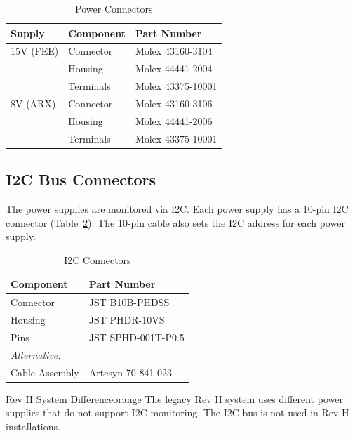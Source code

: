 \begin{table}[htbp]
    \centering
    \caption{Power Connectors}
    \label{tab:power-connectors}
    \begin{tabular}{lll}
        \toprule
        \textbf{Supply} & \textbf{Component} & \textbf{Part Number} \\
        \midrule
        15V (FEE) & Connector & Molex 43160-3104 \\
                  & Housing & Molex 44441-2004 \\
                  & Terminals & Molex 43375-10001 \\
        \midrule
        8V (ARX)  & Connector & Molex 43160-3106 \\
                  & Housing & Molex 44441-2006 \\
                  & Terminals & Molex 43375-10001 \\
        \bottomrule
    \end{tabular}
\end{table}

\subsection{I2C Bus Connectors}

The power supplies are monitored via I2C. Each power supply has a 10-pin I2C connector (Table~\ref{tab:i2c-connectors}).  The 10-pin cable also sets the I2C address for each power supply.

\begin{table}[htbp]
    \centering
    \caption{I2C Connectors}
    \label{tab:i2c-connectors}
    \begin{tabular}{ll}
        \toprule
        \textbf{Component} & \textbf{Part Number} \\
        \midrule
        Connector & JST B10B-PHDSS \\
        Housing & JST PHDR-10VS \\
        Pins & JST SPHD-001T-P0.5 \\
        \midrule
        \multicolumn{2}{l}{\textit{Alternative:}} \\
        Cable Assembly & Artesyn 70-841-023 \\
        \bottomrule
    \end{tabular}
\end{table}

\begin{calloutBox}{Rev H System Difference}{orange}
The legacy Rev H system uses different power supplies that do not support I2C monitoring. The I2C bus is not used in Rev H installations.
\end{calloutBox}

